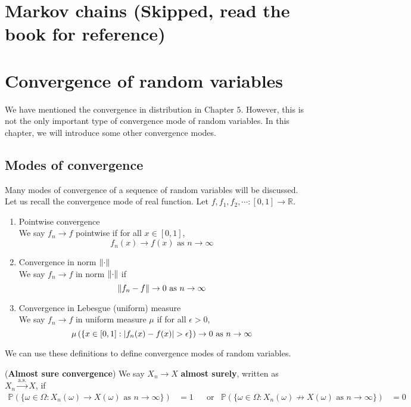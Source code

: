 \documentclass{huhtakm-template-book}
\newcommand{\prob}{\mathbb{P}}
\begin{document}
\chapter{Markov chains (Skipped, read the book for reference)}

\chapter{Convergence of random variables}
We have mentioned the convergence in distribution in Chapter $5$. However, this is not the only important type of convergence mode of random variables. In this chapter, we will introduce some other convergence modes.
\section{Modes of convergence}
Many modes of convergence of a sequence of random variables will be discussed.\\
Let us recall the convergence mode of real function. Let $f,f_{1},f_{2},\cdots:[0,1]\to\mathbb{R}$.
\begin{enumerate}
    \item Pointwise convergence\\
    We say $f_{n}\to f$ pointwise if for all $x\in[0,1]$,
    \begin{equation*}
        f_{n}(x)\to f(x)\text{ as }n\to\infty
    \end{equation*}
    \item Convergence in norm $\lVert{\cdot}\rVert$\\
    We say $f_{n}\to f$ in norm $\lVert{\cdot}\rVert$ if
    \begin{equation*}
        \lVert{f_{n}-f}\rVert\to 0\text{ as }n\to\infty
    \end{equation*}
    \item Convergence in Lebesgue (uniform) measure\\
    We say $f_{n}\to f$ in uniform measure $\mu$ if for all $\epsilon>0$,
    \begin{equation*}
        \mu\left(\{x\in[0,1]:\abs{f_{n}(x)-f(x)}>\epsilon\}\right)\to 0\text{ as }n\to\infty
    \end{equation*}
\end{enumerate}
We can use these definitions to define convergence modes of random variables.
\begin{defn}(\textbf{Almost sure convergence})
    We say $X_{n}\to X$ \textbf{almost surely}, written as $X_{n}\xrightarrow{\text{a.s.}}X$, if
    \begin{align*}
        \prob(\{\omega\in\Omega:X_{n}(\omega)\to X(\omega)\text{ as }n\to\infty\})&=1 & &\text{or} & \prob(\{\omega\in\Omega:X_{n}(\omega)\not\to X(\omega)\text{ as }n\to\infty\})&=0
    \end{align*}
\end{defn}
\end{document}

